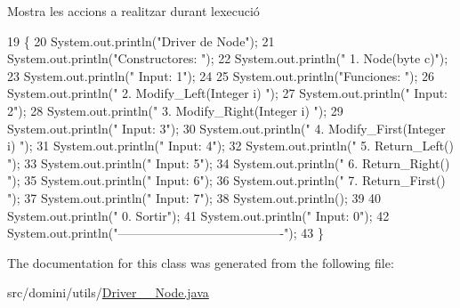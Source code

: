 Mostra les accions a realitzar durant l\textquotesingle{}execució 


\begin{DoxyCode}
19                                      \{
20         System.out.println(\textcolor{stringliteral}{"Driver de Node"});
21         System.out.println(\textcolor{stringliteral}{"Constructores: "});
22         System.out.println(\textcolor{stringliteral}{"     1. Node(byte c)"});
23         System.out.println(\textcolor{stringliteral}{"     Input: 1"});
24 
25         System.out.println(\textcolor{stringliteral}{"Funciones: "});
26         System.out.println(\textcolor{stringliteral}{"     2. Modify\_Left(Integer i) "});
27         System.out.println(\textcolor{stringliteral}{"     Input: 2"});
28         System.out.println(\textcolor{stringliteral}{"     3. Modify\_Right(Integer i) "});
29         System.out.println(\textcolor{stringliteral}{"     Input: 3"});
30         System.out.println(\textcolor{stringliteral}{"     4. Modify\_First(Integer i) "});
31         System.out.println(\textcolor{stringliteral}{"     Input: 4"});
32         System.out.println(\textcolor{stringliteral}{"     5. Return\_Left() "});
33         System.out.println(\textcolor{stringliteral}{"     Input: 5"});
34         System.out.println(\textcolor{stringliteral}{"     6. Return\_Right() "});
35         System.out.println(\textcolor{stringliteral}{"     Input: 6"});
36         System.out.println(\textcolor{stringliteral}{"     7. Return\_First() "});
37         System.out.println(\textcolor{stringliteral}{"     Input: 7"});
38         System.out.println();
39 
40         System.out.println(\textcolor{stringliteral}{"     0. Sortir"});
41         System.out.println(\textcolor{stringliteral}{"     Input: 0"});
42         System.out.println(\textcolor{stringliteral}{"----------------------------------------"});
43     \}
\end{DoxyCode}


The documentation for this class was generated from the following file\+:\begin{DoxyCompactItemize}
\item 
src/domini/utils/\hyperlink{Driver____Node_8java}{Driver\+\_\+\+\_\+\+Node.\+java}\end{DoxyCompactItemize}
